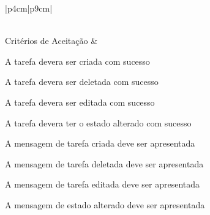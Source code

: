 \begin{tabela}{|p{4cm}|p{9cm}|}
\begin{enumalfa}{0.6}
    \end{enumalfa}\\
    \hline
    Critérios de Aceitação &
    \begin{enumalfa}{0.6}
        \item A tarefa devera ser criada com sucesso
        \item A tarefa devera ser deletada com sucesso
        \item A tarefa devera ser editada com sucesso
        \item A tarefa devera ter o estado alterado com sucesso
        \item A mensagem de tarefa criada deve ser apresentada
        \item A mensagem de tarefa deletada deve ser apresentada
        \item A mensagem de tarefa editada deve ser apresentada
        \item A mensagem de estado alterado deve ser apresentada
    \end{enumalfa}\\
    \hline
\end{tabela}

